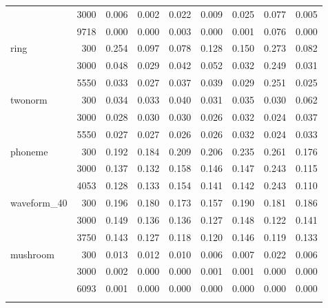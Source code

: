 \begin{tabular}{lrrrrrrrr}
 & 3000 & 0.006 & 0.002 & 0.022 & 0.009 & 0.025 & 0.077 & 0.005\\
 & 9718 & 0.000 & 0.000 & 0.003 & 0.000 & 0.001 & 0.076 & 0.000\\
\addlinespace[1pt]
ring & 300 & 0.254 & 0.097 & 0.078 & 0.128 & 0.150 & 0.273 & 0.082\\
 & 3000 & 0.048 & 0.029 & 0.042 & 0.052 & 0.032 & 0.249 & 0.031\\
 & 5550 & 0.033 & 0.027 & 0.037 & 0.039 & 0.029 & 0.251 & 0.025\\
\addlinespace[1pt]
twonorm & 300 & 0.034 & 0.033 & 0.040 & 0.031 & 0.035 & 0.030 & 0.062\\
 & 3000 & 0.028 & 0.030 & 0.030 & 0.026 & 0.032 & 0.024 & 0.037\\
 & 5550 & 0.027 & 0.027 & 0.026 & 0.026 & 0.032 & 0.024 & 0.033\\
\addlinespace[1pt]
phoneme & 300 & 0.192 & 0.184 & 0.209 & 0.206 & 0.235 & 0.261 & 0.176\\
 & 3000 & 0.137 & 0.132 & 0.158 & 0.146 & 0.147 & 0.243 & 0.115\\
 & 4053 & 0.128 & 0.133 & 0.154 & 0.141 & 0.142 & 0.243 & 0.110\\
\addlinespace[1pt]
waveform\_40 & 300 & 0.196 & 0.180 & 0.173 & 0.157 & 0.190 & 0.181 & 0.186\\
 & 3000 & 0.149 & 0.136 & 0.136 & 0.127 & 0.148 & 0.122 & 0.141\\
 & 3750 & 0.143 & 0.127 & 0.118 & 0.120 & 0.146 & 0.119 & 0.133\\
\addlinespace[1pt]
mushroom & 300 & 0.013 & 0.012 & 0.010 & 0.006 & 0.007 & 0.022 & 0.006\\
 & 3000 & 0.002 & 0.000 & 0.000 & 0.001 & 0.001 & 0.000 & 0.000\\
 & 6093 & 0.001 & 0.000 & 0.000 & 0.000 & 0.000 & 0.000 & 0.000\\
\addlinespace[1pt]
\bottomrule
\end{tabular}
